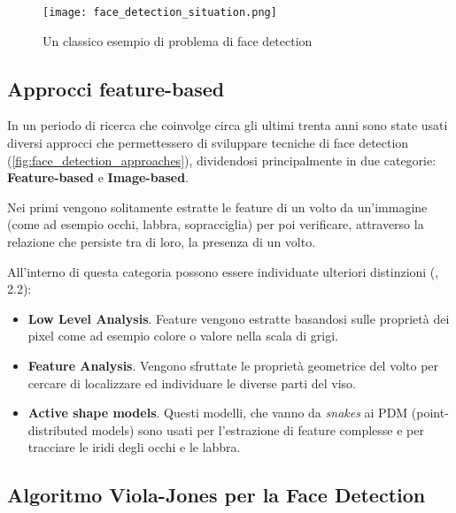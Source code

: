 \begin{figure}
    \begin{small}
        \begin{center}
            \texttt{[image: face\_detection\_situation.png]}
        \end{center}
        \caption{Un classico esempio di problema di face detection \cite{Datta2015}}
        \label{fig:fd_problem}
    \end{small}
\end{figure}

\subsection{Approcci feature-based}
\label{section:face_detection_approaches}

In un periodo di ricerca che coinvolge circa gli ultimi trenta anni sono state 
usati diversi approcci che permettessero di sviluppare tecniche di face detection
(\ref{fig:face_detection_approaches}), dividendosi principalmente in due categorie: 
\textbf{Feature-based} e \textbf{Image-based}.

Nei primi vengono solitamente estratte le feature di un volto da 
un'immagine (come ad esempio occhi, labbra, sopracciglia) per poi verificare, 
attraverso la relazione che persiste tra di loro, la presenza di un volto.

All'interno di questa categoria possono essere individuate ulteriori distinzioni
(\cite{Datta2015}, 2.2):

\begin{itemize}
    \item \textbf{Low Level Analysis}. Feature vengono estratte basandosi sulle 
        proprietà dei pixel come ad esempio colore o valore nella scala di grigi.
    \item \textbf{Feature Analysis}. Vengono sfruttate le proprietà geometrice 
        del volto per cercare di localizzare ed individuare le diverse parti del viso.
    \item \textbf{Active shape models}. Questi modelli, che vanno da \textit{snakes}
        ai PDM (point-distributed models) sono usati per l'estrazione di feature 
        complesse e per tracciare le iridi degli occhi e le labbra.  
\end{itemize}

\subsection{Algoritmo Viola-Jones per la Face Detection}
\label{section:viola_jones}

